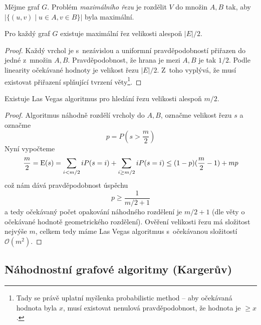 
\begin{definition}
    Mějme graf $G$. Problém {\em maximálního řezu} je rozdělit $V$ do
    množin $A, B$ tak, aby $\lvert \{ (u,v) \mid u \in A, v \in B \}
    \rvert$ byla maximální.
\end{definition}

\begin{theorem}
    Pro každý graf $G$ existuje maximální řez velikosti alespoň
    $\lvert E \rvert / 2$.
\end{theorem}

\begin{proof}
    Každý vrchol je s~nezávislou a uniformní pravděpodobností přiřazen
    do jedné z~množin $A, B$. Pravděpodobnost, že hrana je mezi $A, B$
    je tak $1/2$. Podle linearity očekávané hodnoty je velikost řezu
    $\lvert E \rvert / 2$. Z~toho vyplývá, že musí existovat přiřazení
    splňující tvrzení věty\footnote{Tady se právě uplatní myšlenka
    probabilistic method -- aby očekávaná hodnota byla $x$, musí
    existovat nenulová pravděpodobnost, že hodnota je $\geq x$.}.
\end{proof}

\begin{theorem}
    Existuje Las Vegas algoritmus pro hledání řezu velikosti alespoň
    $m/2$.
\end{theorem}

\begin{proof}
    Algoritmus náhodně rozdělí vrcholy do $A, B$, označme velikost řezu
    $s$ a označme
    \[
    p = P(s > \frac{m}{2})
    \]
    Nyní vypočteme
    \[
        \frac{m}{2}
        = \operatorname{E}(s)
        = \sum_{i < m/2} i P(s = i)
        + \sum_{i \geq m/2} i P(s = i)
        \leq (1-p)(\frac{m}{2} - 1) + mp
    \]
    což nám dává pravděpodobnost úspěchu
    \[
        p \geq \frac{1}{m/2 + 1}
    \]
    a tedy očekávaný počet opakování náhodného rozdělení je $m/2 + 1$
    (dle věty o očekávané hodnotě geometrického rozdělení).
    Ověření velikosti řezu má složitost nejvýše $m$, celkem tedy máme
    Las Vegas algoritmus s~očekávanou složitostí $\mathcal{O}(m^2)$.
\end{proof}

\subsection{Náhodnostní grafové algoritmy (Kargerův)}

